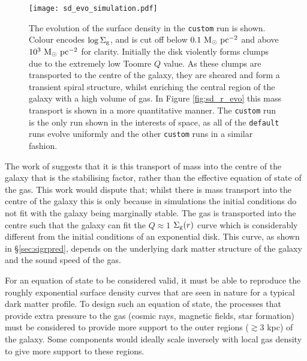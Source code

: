 \begin{figure}[ht]
    \texttt{[image: sd\_evo\_simulation.pdf]}
    \caption{The evolution of the surface density in the {\tt custom} run is shown. Colour encodes $\log\Sigma_\mathrm{g}$, and is cut off below $0.1 ~\mathrm{M}_{\odot} ~\mathrm{pc}^{-2}$ and above $10^3 ~\mathrm{M}_{\odot} ~\mathrm{pc}^{-2}$ for clarity. Initially the disk violently forms clumps due to the extremely low Toomre $Q$ value. As these clumps are transported to the centre of the galaxy, they are sheared and form a transient spiral structure, whilst enriching the central region of the galaxy with a high volume of gas. In Figure \ref{fig:sd_r_evo} this mass transport is shown in a more quantitative manner. The {\tt custom} run is the only run shown in the interests of space, as all of the {\tt default} runs evolve uniformly and the other {\tt custom} runs in a similar fashion.}
    \label{fig:sd_evo_small}
\end{figure}

The work of \citet{krumholz_is_2016} suggests that it is this transport of mass into the centre of the galaxy that is the stabilising factor, rather than the effective equation of state of the gas.
This work would dispute that; whilst there is mass transport into the centre of the galaxy this is only because in simulations the initial conditions do not fit with the galaxy being marginally stable.
The gas is transported into the centre such that the galaxy can fit the $Q\approx1$ $\Sigma_\mathrm{g}(r)$ curve which is considerably different from the initial conditions of an exponential disk.
This curve, as shown in \S \ref{sec:sigrpred}, depends on the underlying dark matter structure of the galaxy and the sound speed of the gas.

For an equation of state to be considered valid, it must be able to reproduce the roughly exponential surface density curves that are seen in nature for a typical dark matter profile.
To design such an equation of state, the processes that provide extra pressure to the gas (cosmic rays, magnetic fields, star formation) must be considered to provide more support to the outer regions ($\gtrsim 3$ kpc) of the galaxy.
Some components would ideally scale inversely with local gas density to give more support to these regions.

